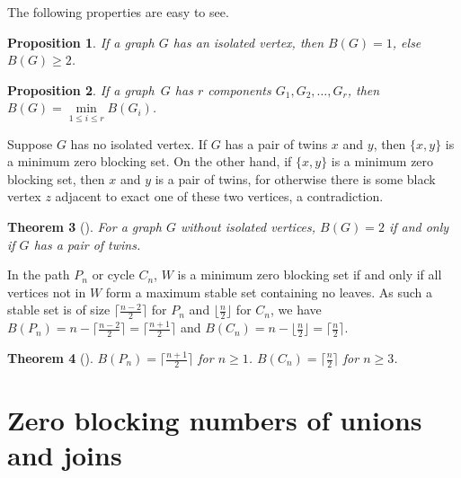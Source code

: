 \documentclass[preprint,12pt]{elsarticle}
\newtheorem{theorem}{Theorem}
\newtheorem{proposition}[theorem]{Proposition}
\begin{document}
{The following properties are easy to see.

\begin{proposition}
If a graph $G$ has an isolated vertex, then $B(G)=1$, else $B(G)\ge 2$.
\end{proposition}

\begin{proposition} \label{component}
If a graph\ $G$ has $r$ components $G_1, G_2,\ldots,G_r$, then $B(G)=\min\limits_{1\le i\le r} B(G_i)$.
\end{proposition}

Suppose $G$ has no isolated vertex.
If $G$ has a pair of twins $x$ and $y$, then $\{x,y\}$ is a minimum zero blocking set.
On the other hand, if $\{x,y\}$ is a minimum zero blocking set, then $x$ and $y$ is a pair of twins,
for otherwise there is some black vertex $z$ adjacent to exact one of these two vertices, a contradiction.

\begin{theorem}[\cite{2015fjs}] \label{twins}
For a graph $G$ without isolated vertices, $B(G)=2$ if and only if $G$ has a pair of twins.
\end{theorem}

In the path $P_n$ or cycle $C_n$, $W$ is a minimum zero blocking set if and only if all vertices not in $W$ form a maximum stable set containing no leaves.
As such a stable set is of size $\lceil\frac{n-2}{2}\rceil$ for $P_n$ and $\lfloor\frac{n}{2}\rfloor$ for $C_n$, we have
$B(P_n) = n - \lceil\frac{n-2}{2}\rceil = \lceil\frac{n+1}{2}\rceil$ and
$B(C_n) = n- \lfloor\frac{n}{2}\rfloor = \lceil\frac{n}{2}\rceil$.

\begin{theorem}[\cite{2015fjs}] \label{path-cycle}
$B(P_n)=\lceil\frac{n+1}{2}\rceil$ for $n\ge 1$.
$B(C_n)=\lceil\frac{n}{2}\rceil$ for $n\ge 3$.
\end{theorem}



\section{Zero blocking numbers of unions and joins} \label{sec-union-join}

}
\end{document}
